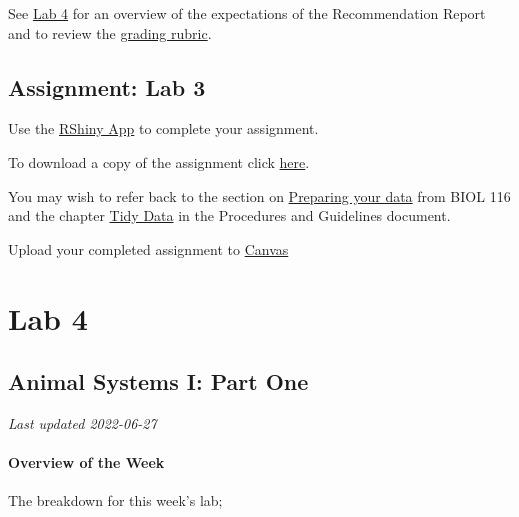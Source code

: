 \documentclass[
]{book}
\begin{document}
See \href{https://ubco-biology.github.io/BIOL-125-Lab-Manual-Summer/assignment-recommendation-report.html}{Lab 4} for an overview of the expectations of the Recommendation Report and to review the \href{https://ubco-biology.github.io/BIOL-125-Lab-Manual-Summer/recommendation-report-rubric-1.html}{grading rubric}.

\hypertarget{assignment-lab-3}{%
\chapter*{Assignment: Lab 3}\label{assignment-lab-3}}

Use the \href{https://openscience.ok.ubc.ca/shiny/BIOL-116/}{RShiny App} to complete your assignment.

To download a copy of the assignment click \href{files/Lab_3_RShiny_Assignment_2.pdf}{here}.

You may wish to refer back to the section on \href{https://ubco-biology.github.io/BIOL-116-Lab-Manual/preparing-your-data.html}{Preparing your data} from BIOL 116 and the chapter \href{https://ubco-biology.github.io/Procedures-and-Guidelines/tidy-data.html}{Tidy Data} in the Procedures and Guidelines document.

Upload your completed assignment to \href{https://canvas.ubc.ca/}{Canvas}

\hypertarget{part-lab-4}{%
\part*{Lab 4}\label{part-lab-4}}

\hypertarget{animal-systems-i-part-one}{%
\chapter*{Animal Systems I: Part One}\label{animal-systems-i-part-one}}

\emph{Last updated 2022-06-27}

\hypertarget{overview-of-the-week}{%
\subsection*{Overview of the Week}\label{overview-of-the-week}}

The breakdown for this week's lab;
\end{document}
